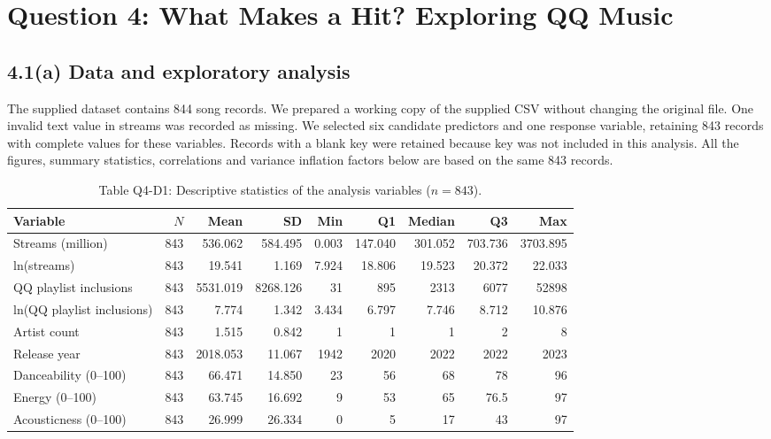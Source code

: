\section{Question 4: What Makes a Hit? Exploring QQ Music}

\FloatBarrier
\subsection*{4.1(a) Data and exploratory analysis}

The supplied dataset contains 844 song records. We prepared a working copy of the supplied CSV without changing the original file. One invalid text value in streams was recorded as missing. We selected six candidate predictors and one response variable, retaining 843 records with complete values for these variables. Records with a blank key were retained because key was not included in this analysis. All the figures, summary statistics, correlations and variance inflation factors below are based on the same 843 records.

\begin{table}[htbp]
  \centering
  \small
  \caption*{Table Q4-D1: Descriptive statistics of the analysis variables ($n = 843$).}
  \setlength{\tabcolsep}{3.5pt}
  \begin{tabular}{lrrrrrrrr}
    \toprule
    Variable & $N$ & Mean & SD & Min & Q1 & Median & Q3 & Max \\
    \midrule
    Streams (million) & 843 & 536.062 & 584.495 & 0.003 & 147.040 & 301.052 & 703.736 & 3703.895 \\
    ln(streams) & 843 & 19.541 & 1.169 & 7.924 & 18.806 & 19.523 & 20.372 & 22.033 \\
    QQ playlist inclusions & 843 & 5531.019 & 8268.126 & 31 & 895 & 2313 & 6077 & 52898 \\
    ln(QQ playlist inclusions) & 843 & 7.774 & 1.342 & 3.434 & 6.797 & 7.746 & 8.712 & 10.876 \\
    Artist count & 843 & 1.515 & 0.842 & 1 & 1 & 1 & 2 & 8 \\
    Release year & 843 & 2018.053 & 11.067 & 1942 & 2020 & 2022 & 2022 & 2023 \\
    Danceability (0--100) & 843 & 66.471 & 14.850 & 23 & 56 & 68 & 78 & 96 \\
    Energy (0--100) & 843 & 63.745 & 16.692 & 9 & 53 & 65 & 76.5 & 97 \\
    Acousticness (0--100) & 843 & 26.999 & 26.334 & 0 & 5 & 17 & 43 & 97 \\
    \bottomrule
  \end{tabular}
\end{table}

